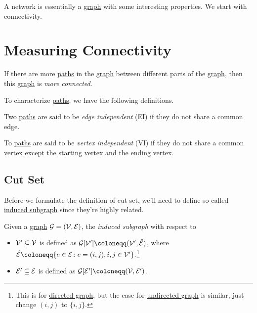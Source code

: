 A network is essentially a \hyperref[def:graph]{graph} with some interesting properties. We start with connectivity.

\section{Measuring Connectivity}
\begin{intuition}
	If there are more \hyperref[def:path]{paths} in the \hyperref[def:graph]{graph} between different parts of the \hyperref[def:graph]{graph}, then this \hyperref[def:graph]{graph} is \emph{more connected}.
\end{intuition}

To characterize \hyperref[def:path]{paths}, we have the following definitions.
\begin{definition}\label{def:edge-independent}
	Two \hyperref[def:path]{paths} are said to be \emph{edge independent} (EI) if they do not share a common edge.
\end{definition}

\begin{definition}\label{def:vertex-independent}
	To \hyperref[def:path]{paths} are said to be \emph{vertex independent} (VI) if they do not share a common vertex except the starting vertex and the ending vertex.
\end{definition}

\subsection{Cut Set}
Before we formulate the definition of cut set, we'll need to define so-called \hyperref[def:induced-subgraph]{induced subgraph} since they're highly related.

\begin{definition}\label{def:induced-subgraph}
	Given a \hyperref[def:graph]{graph} \(\mathcal{\MakeUppercase{g}} = (\mathcal{\MakeUppercase{v}} , \mathcal{\MakeUppercase{e}} )\), the \emph{induced subgraph} with respect to
	\begin{itemize}
		\item \(\mathcal{\MakeUppercase{v}}^\prime \subseteq \mathcal{\MakeUppercase{v}} \) is defined as \(\mathcal{\MakeUppercase{g}} [\mathcal{\MakeUppercase{v}} ^\prime ] \coloneqq (\mathcal{\MakeUppercase{v}} ^\prime, \hat{\mathcal{\MakeUppercase{e}}})\), where \(\hat{\mathcal{\MakeUppercase{e}} }\coloneqq \{e\in \mathcal{\MakeUppercase{e}} \colon e = (i, j), i, j\in \mathcal{\MakeUppercase{v}} ^\prime\}\).\footnote{This is for \hyperref[def:directed-graph]{directed graph}, but the case for \hyperref[def:undirected-graph]{undirected graph} is similar, just change \((i, j)\) to \(\{i, j\}\).}
		\item \(\mathcal{\MakeUppercase{e}}^\prime \subseteq \mathcal{\MakeUppercase{e}} \) is defined as \(\mathcal{\MakeUppercase{g}} [\mathcal{\MakeUppercase{e}} ^\prime ] \coloneqq (\mathcal{\MakeUppercase{v}} , \mathcal{\MakeUppercase{e}}^\prime )\).
	\end{itemize}
\end{definition}

